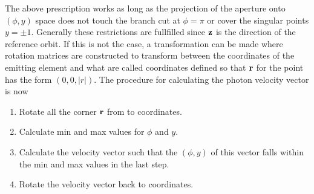 The above prescription works as long as the projection of the aperture onto $(\phi, y)$ space does
not touch the branch cut at $\phi = \pi$ or cover the singular points $y = \pm 1$. Generally these
restrictions are fullfilled since ${\bf z}$ is the direction of the reference orbit. If this is not
the case, a transformation can be made where rotation matrices are constructed to transform between
the  coordinates of the emitting element and what are called  coordinates
defined so that ${\bf r}$ for the  point has the form $(0, 0, |r|)$. The procedure for
calculating the photon velocity vector is now
  \begin{enumerate}
  \item
Rotate all the corner ${\bf r}$ from  to  coordinates.
  \item
Calculate min and max values for $\phi$ and $y$.
  \item
Calculate the velocity vector such that the $(\phi, y)$ of this vector
falls within the min and max values in the last step.
  \item
Rotate the velocity vector back to  coordinates.
  \end{enumerate}

